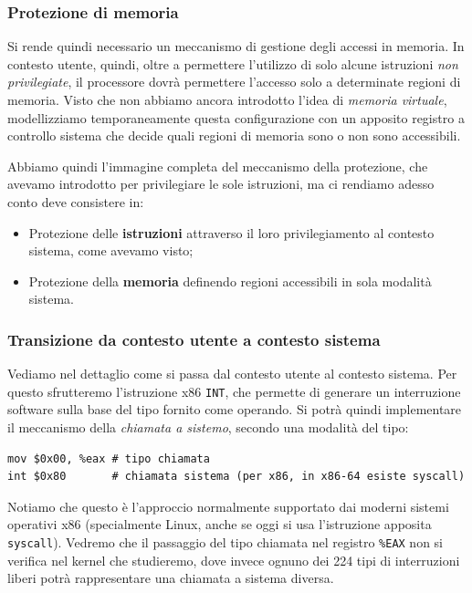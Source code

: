 \documentclass[a4paper,11pt]{article}
\begin{document}
\subsubsection{Protezione di memoria}
Si rende quindi necessario un meccanismo di gestione degli accessi in memoria.
In contesto utente, quindi, oltre a permettere l'utilizzo di solo alcune istruzioni \textit{non privilegiate}, il processore dovrà permettere l'accesso solo a determinate regioni di memoria. 
Visto che non abbiamo ancora introdotto l'idea di \textit{memoria virtuale}, modellizziamo temporaneamente questa configurazione con un apposito registro a controllo sistema che decide quali regioni di memoria sono o non sono accessibili.

Abbiamo quindi l'immagine completa del meccanismo della protezione, che avevamo introdotto per privilegiare le sole istruzioni, ma ci rendiamo adesso conto deve consistere in:
\begin{itemize}
	\item Protezione delle \textbf{istruzioni} attraverso il loro privilegiamento al contesto sistema, come avevamo visto;
	\item Protezione della \textbf{memoria} definendo regioni accessibili in sola modalità sistema.
\end{itemize}

\subsubsection{Transizione da contesto utente a contesto sistema}
Vediamo nel dettaglio come si passa dal contesto utente al contesto sistema.
Per questo sfrutteremo l'istruzione x86 \lstinline|INT|, che permette di generare un interruzione software sulla base del tipo fornito come operando.
Si potrà quindi implementare il meccanismo della \textit{chiamata a sistemo}, secondo una modalità del tipo:
\begin{lstlisting}[language=assembler, style=codestyle]	
mov $0x00, %eax # tipo chiamata
int $0x80       # chiamata sistema (per x86, in x86-64 esiste syscall)
\end{lstlisting}
Notiamo che questo è l'approccio normalmente supportato dai moderni sistemi operativi x86 (specialmente Linux, anche se oggi si usa l'istruzione apposita \lstinline|syscall|).
Vedremo che il passaggio del tipo chiamata nel registro \lstinline|%EAX| non si verifica nel kernel che studieremo, dove invece ognuno dei 224 tipi di interruzioni liberi potrà rappresentare una chiamata a sistema diversa.
\end{document}
